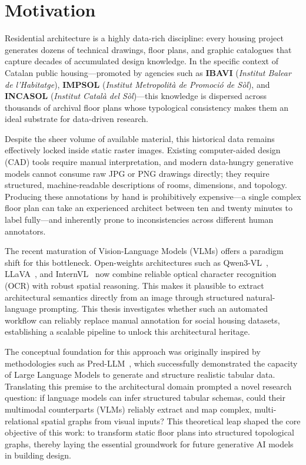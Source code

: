 \documentclass[12pt,a4paper,openright]{report}
\begin{document}
\section{Motivation}
\label{sec:motivation}

Residential architecture is a highly data-rich discipline: every housing project generates dozens of technical drawings, floor plans, and graphic catalogues that capture decades of accumulated design knowledge. In the specific context of Catalan public housing---promoted by agencies such as \textbf{IBAVI} (\textit{Institut Balear de l'Habitatge}), \textbf{IMPSOL} (\textit{Institut Metropolità de Promoció de Sòl}), and \textbf{INCASOL} (\textit{Institut Català del Sòl})---this knowledge is dispersed across thousands of archival floor plans whose typological consistency makes them an ideal substrate for data-driven research.

Despite the sheer volume of available material, this historical data remains effectively locked inside static raster images. Existing computer-aided design (CAD) tools require manual interpretation, and modern data-hungry generative models cannot consume raw JPG or PNG drawings directly; they require structured, machine-readable descriptions of rooms, dimensions, and topology. Producing these annotations by hand is prohibitively expensive---a single complex floor plan can take an experienced architect between ten and twenty minutes to label fully---and inherently prone to inconsistencies across different human annotators.

The recent maturation of Vision-Language Models (VLMs) offers a paradigm shift for this bottleneck. Open-weights architectures such as Qwen3-VL~\cite{bai2023qwenvlversatilevisionlanguagemodel}, LLaVA~\cite{liu2023llava}, and InternVL~\cite{chen2024internvlscalingvisionfoundation} now combine reliable optical character recognition (OCR) with robust spatial reasoning. This makes it plausible to extract architectural semantics directly from an image through structured natural-language prompting. This thesis investigates whether such an automated workflow can reliably replace manual annotation for social housing datasets, establishing a scalable pipeline to unlock this architectural heritage.

The conceptual foundation for this approach was originally inspired by methodologies such as Pred-LLM~\cite{nguyen2024generatingrealistictabulardata}, which successfully demonstrated the capacity of Large Language Models to generate and structure realistic tabular data. Translating this premise to the architectural domain prompted a novel research question: if language models can infer structured tabular schemas, could their multimodal counterparts (VLMs) reliably extract and map complex, multi-relational spatial graphs from visual inputs? This theoretical leap shaped the core objective of this work: to transform static floor plans into structured topological graphs, thereby laying the essential groundwork for future generative AI models in building design.
\end{document}
